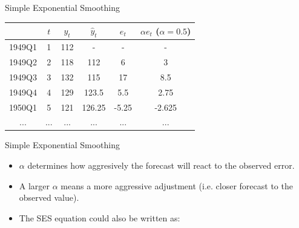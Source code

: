\documentclass{beamer}\usepackage[]{graphicx}\usepackage[]{color}
\makeatletter
\newcommand{\hlnum}[1]{\textcolor[rgb]{0.824,0.412,0.118}{#1}}%
\newcommand{\hlstr}[1]{\textcolor[rgb]{1,0.894,0.71}{#1}}%
\newcommand{\hlopt}[1]{\textcolor[rgb]{1,0.894,0.769}{#1}}%
\newcommand{\hlstd}[1]{\textcolor[rgb]{1,0.894,0.769}{#1}}%
\newcommand{\hlkwb}[1]{\textcolor[rgb]{0.804,0.776,0.451}{#1}}%
\newcommand{\hlkwc}[1]{\textcolor[rgb]{0.78,0.941,0.545}{#1}}%
\newcommand{\hlkwd}[1]{\textcolor[rgb]{1,0.78,0.769}{#1}}%
\newenvironment{kframe}{%
 \def\at@end@of@kframe{}%
 \ifinner\ifhmode%
  \def\at@end@of@kframe{\end{minipage}}%
  \begin{minipage}{\columnwidth}%
 \fi\fi%
 \def\FrameCommand##1{\hskip\@totalleftmargin \hskip-\fboxsep
 \colorbox{shadecolor}{##1}\hskip-\fboxsep
     \hskip-\linewidth \hskip-\@totalleftmargin \hskip\columnwidth}%
 \MakeFramed {\advance\hsize-\width
   \@totalleftmargin\z@ \linewidth\hsize
   \@setminipage}}%
 {\par\unskip\endMakeFramed%
 \at@end@of@kframe}
\newenvironment{knitrout}{}{} %
\makeatother
\begin{document}
\begin{darkframes}
\begin{frame}[fragile]{Simple Exponential Smoothing}
\begin{center}
          \begin{tabular}{cccccc}
          \hline
             &  $t$ & $y_t$ & $\hat{y}_t$ & $e_t$ & $\alpha e_t$ ($\alpha=0.5$) \\
          \hline
          1949Q1	&	1	&	112	&	-	&	-	&	-           \\
          1949Q2	&	2	&	118	&	112	&	6	&	3         \\
          1949Q3	&	3	&	132	&	115	&	17	&	8.5     \\
          1949Q4	&	4	&	129	&	123.5	&	5.5	&	2.75  \\   
          1950Q1	&	5	&	121	&	126.25	&	-5.25	&	-2.625  \\
          ...	&	...	&	...	&	...	&	...	&	... \\
            \hline 
        \end{tabular}
      \end{center}
    
    \end{frame}
    
    
    
    
    
    
    \begin{frame}[fragile]{Simple Exponential Smoothing}
      \fontsize{9}{9}\selectfont
      
        \begin{itemize}[<+->]
        \item $\alpha$ determines how aggresively the forecast will react to the observed error.
        \item A larger $\alpha$ means a more aggressive adjustment (i.e. closer forecast to the observed value).
        \item The SES equation could also be written as:
    \end{itemize} \pause
    

\end{frame}
\end{darkframes}
\end{document}
